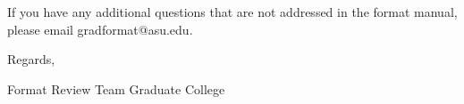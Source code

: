 





If you have any additional questions that are not addressed in the format manual, please email gradformat@asu.edu.   

Regards, 

Format Review Team
Graduate College